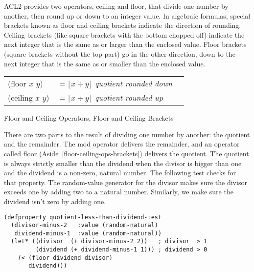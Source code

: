 \begin{aside}
ACL2 provides two operators,
\textsf{ceiling} and \textsf{floor}, that divide one number by another,
then round up or down to an integer value.
In algebraic formulas, special brackets known as
floor and ceiling brackets indicate the direction of rounding.
Ceiling brackets (like square brackets with the bottom chopped off)
indicate the next integer that is the same as or larger than
the enclosed value.
Floor brackets (square brackets without the top part)
go in the other direction, down to the next integer
that is the same as or smaller than the enclosed value.
\vspace{2mm}
\begin{center}
\begin{tabular}{lll}
\textsf{(floor $x$ $y$)}  & $= \lfloor x \div y \rfloor$ \emph{quotient rounded down} \vspace{1mm}\\
\textsf{(ceiling $x$ $y$)}& $= \lceil x  \div y \rceil $ \emph{quotient rounded up}   \\
\end{tabular}
\end{center}
\caption{Floor and Ceiling Operators, Floor and Ceiling Brackets}
\label{floor-def}
\label{ceiling-def}
\label{floor-ceiling-ops-brackets}
\end{aside}

There are two parts to the result
of dividing one number by another: the quotient and the remainder.
The \textsf{mod} operator delivers the remainder,
and an operator called \textsf{floor} (Aside~\ref{floor-ceiling-ops-brackets})
delivers the quotient.
The quotient is always strictly smaller
than the dividend when the divisor is bigger than one
and the dividend is a non-zero, natural number.
The following test checks for that property.
The random-value generator for the divisor
makes sure the divisor exceeds one by adding two
to a natural number.
Similarly, we make sure the dividend isn't zero by adding one.

\label{quotient-less-than-dividend-test}
\begin{Verbatim}
(defproperty quotient-less-than-dividend-test
  (divisor-minus-2   :value (random-natural)
   dividend-minus-1  :value (random-natural))
  (let* ((divisor  (+ divisor-minus-2 2))   ; divisor  > 1
         (dividend (+ dividend-minus-1 1))) ; dividend > 0
    (< (floor dividend divisor)
       dividend)))
\end{Verbatim}

